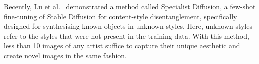 \documentclass[conference]{IEEEtran}
\begin{document}
Recently, Lu et al.~\cite{lu_specialist_2023} demonstrated a method called Specialist Diffusion, a few-shot fine-tuning of Stable Diffusion for content-style disentanglement, specifically designed for synthesising known objects in unknown styles. Here, unknown styles refer to the styles that were not present in the training data. With this method, less than 10 images of any artist suffice to capture their unique aesthetic and create novel images in the same fashion.



\end{document}
